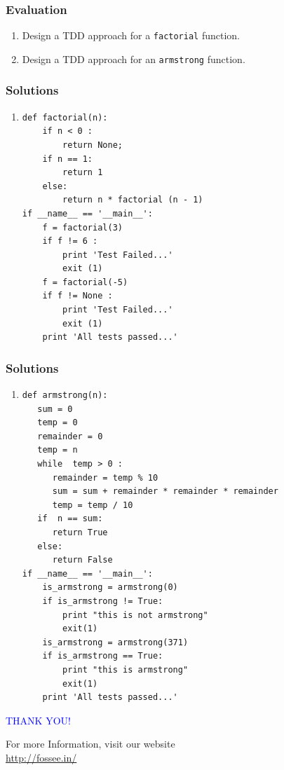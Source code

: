 \documentclass[12pt,presentation]{beamer}
\begin{document}
\begin{frame}[fragile]
\frametitle{Evaluation}
\label{sec-9}


\begin{enumerate}
\item Design a TDD approach for a \texttt{factorial} function.
\vspace{8pt}
\item Design a TDD approach for an \texttt{armstrong} function.
\end{enumerate}
\end{frame}

\begin{frame}[fragile]
\frametitle{Solutions}
\label{sec-10}
\begin{enumerate}
\vspace{15pt}
\item
{\tiny
\begin{lstlisting}
def factorial(n):
    if n < 0 :
        return None;
    if n == 1:
        return 1
    else:
        return n * factorial (n - 1)
if __name__ == '__main__':
    f = factorial(3)
    if f != 6 :
        print 'Test Failed...'
        exit (1)    
    f = factorial(-5)
    if f != None :
        print 'Test Failed...'
        exit (1)    
    print 'All tests passed...'
\end{lstlisting}
}
\end{enumerate}
\end{frame}

\begin{frame}[fragile]
\frametitle{Solutions}
\label{sec-10}
\begin{enumerate}
\vspace{15pt}
\item
{\tiny
\begin{lstlisting}
def armstrong(n):
   sum = 0
   temp = 0 
   remainder = 0
   temp = n 
   while  temp > 0 :
      remainder = temp % 10
      sum = sum + remainder * remainder * remainder
      temp = temp / 10 
   if  n == sum:
      return True
   else:
      return False
if __name__ == '__main__':
    is_armstrong = armstrong(0)
    if is_armstrong != True:
        print "this is not armstrong"
        exit(1)
    is_armstrong = armstrong(371)
    if is_armstrong == True:
        print "this is armstrong"
        exit(1)
    print 'All tests passed...'
\end{lstlisting}
}
\end{enumerate}
\end{frame}

\begin{frame}

  \begin{block}{}
  \begin{center}
  \textcolor{blue}{\Large THANK YOU!} 
  \end{center}
  \end{block}
\begin{block}{}
  \begin{center}
    For more Information, visit our website\\
    \url{http://fossee.in/}
  \end{center}  
  \end{block}
\end{frame}
\end{document}
